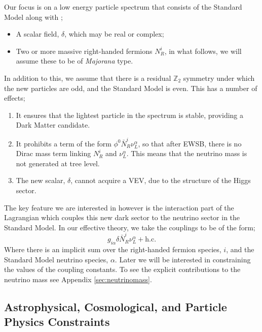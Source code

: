 Our focus is on a low energy particle spectrum that consists of the Standard Model along with \cite{Farzan2014, Farzan2011};
\begin{itemize}
  \item A scalar field, $\delta$, which may be real or complex;
  \item Two or more massive right-handed fermions $N^i_R$, in what follows, we will assume these to be of \textit{Majorana} type.
\end{itemize}
In addition to this, we assume that there is a residual $\mathbb{Z}_2$ symmetry \cite{Ma1998, Ma2001, Ma2006} under which the new particles are odd, and the Standard Model is even. This has a number of effects;
\clearpage
\begin{enumerate}
  \item It ensures that the lightest particle in the spectrum is stable, providing a Dark Matter candidate.
  \item It prohibits a term of the form $\phi^0 \bar{N}_R^i \nu^\alpha_L$, so that after EWSB, there is no Dirac mass term linking $N^i_R$ and $\nu^\alpha_L$. This means that the neutrino mass is not generated at tree level.
  \item The new scalar, $\delta$, cannot acquire a VEV, due to the structure of the Higgs sector.
\end{enumerate}
The key feature we are interested in however is the interaction part of the Lagrangian which couples this new dark sector to the neutrino sector in the Standard Model. In our effective theory, we take the couplings to be of the form;
\begin{equation}\label{eq:effective lagrangian}
  g_{i\alpha}\delta \bar{N}^i_R \nu^\alpha_L + \text{h.c.}
\end{equation}
\noindent Where there is an implicit sum over the right-handed fermion species, $i$, and the Standard Model neutrino species, $\alpha$. Later we will be interested in constraining the values of the coupling constants. To see the explicit contributions to the neutrino mass see Appendix \ref{sec:neutrinomass}. 

\subsection{Astrophysical, Cosmological, and Particle Physics Constraints}




